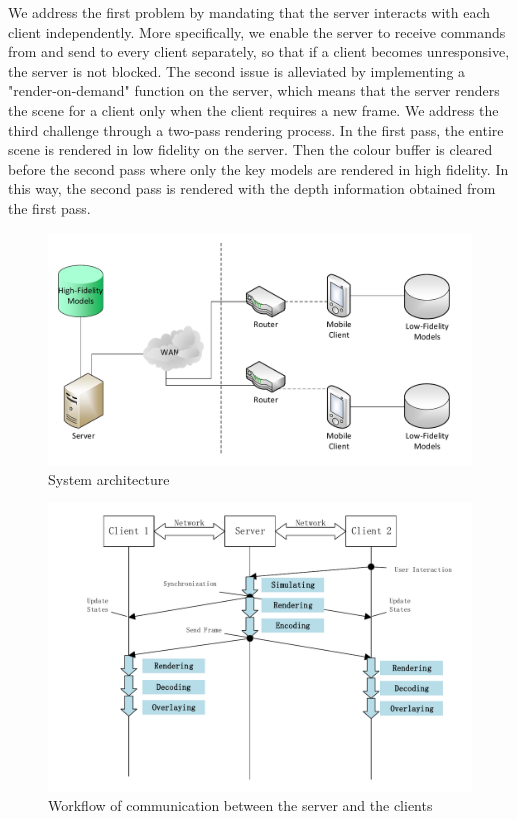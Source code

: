 We address the first problem by mandating that the server interacts with each client independently. More specifically, we enable the server to receive commands from and send to every client separately, so that if a client becomes unresponsive, the server is not blocked.
The second issue is alleviated by implementing a "render-on-demand" function on the server, which means that the server renders the scene for a client only when the client requires a new frame.
We address the third challenge through a two-pass rendering process. In the first pass, the entire scene is rendered in low fidelity on the server. Then the colour buffer is cleared before the second pass where only the key models are rendered in high fidelity. In this way, the second pass is rendered with the depth information obtained from the first pass.

\begin{figure}[!htbp]
	\includegraphics[width=\textwidth]{figures/architecture.pdf}
	\caption{System architecture}
	\label{fig:architecture}
\end{figure}

\begin{figure}[!htbp]
	\includegraphics[width=\textwidth]{figures/sequence_workflow.pdf}
	\caption{Workflow of communication between the server and the clients}
	\label{fig:swf}
\end{figure}

